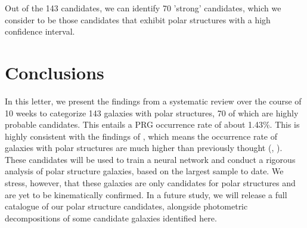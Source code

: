 \documentclass[letter]{aa}
\begin{document}
Out of the 143 candidates, we can identify 70 'strong' candidates, which we consider to be those candidates that exhibit polar structures with a high confidence interval. 
 

\section{Conclusions}
\label{sec:conclusions}

In this letter, we present the findings from a systematic review over the course of 10 weeks to categorize 143 galaxies with polar structures, 70 of which are highly probable candidates. 
This entails a PRG occurrence rate of about 1.43\%. 
This is highly consistent with the findings of \citet{2024AstL...}, which means the occurrence rate of galaxies with polar structures are much higher than previously thought (\citealt{1990AJ....100.1489W}, \citealt{2011MNRAS.418..244M}). These candidates will be used to train a neural network and conduct a rigorous analysis of polar structure galaxies, based on the largest sample to date. We stress, however, that these galaxies are only candidates for polar structures and are yet to be kinematically confirmed. In a future study, we will release a full catalogue of our polar structure candidates, alongside photometric decompositions of some candidate galaxies identified here. 
\end{document}
